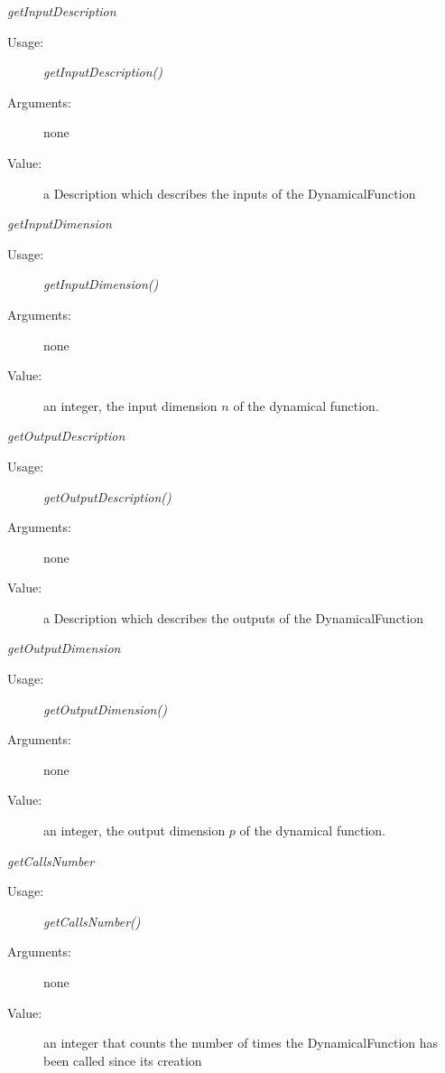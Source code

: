 \begin{description}
\begin{description}
\item \textit{getInputDescription}
\begin{description}
\item[Usage:] \textit{getInputDescription()}
\item[Arguments:] none
\item[Value:] a Description which describes the inputs of the DynamicalFunction
\end{description}
\bigskip

\item \textit{getInputDimension}
\begin{description}
\item[Usage:] \textit{getInputDimension()}
\item[Arguments:] none
\item[Value:] an integer, the input dimension $n$ of the dynamical function.
\end{description}
\bigskip

\item \textit{getOutputDescription}
\begin{description}
\item[Usage:] \textit{getOutputDescription()}
\item[Arguments:] none
\item[Value:] a Description which describes the outputs of the DynamicalFunction
\end{description}
\bigskip

\item \textit{getOutputDimension}
\begin{description}
\item[Usage:] \textit{getOutputDimension()}
\item[Arguments:] none
\item[Value:] an integer, the output dimension $p$ of the dynamical function.
\end{description}
\bigskip

\item \textit{getCallsNumber}
\begin{description}
\item[Usage:] \textit{getCallsNumber()}
\item[Arguments:] none
\item[Value:] an integer that counts the number of times the DynamicalFunction has been called since its creation
\end{description}
\bigskip


\end{description}
\end{description}
